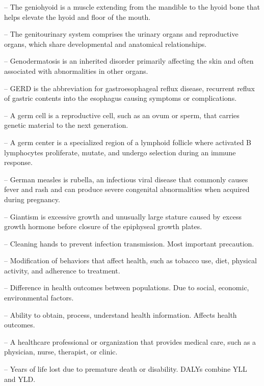 -- The geniohyoid is a muscle extending from the mandible to the hyoid bone that helps elevate the hyoid and floor of the mouth.

-- The genitourinary system comprises the urinary organs and reproductive organs, which share developmental and anatomical relationships.

-- Genodermatosis is an inherited disorder primarily affecting the skin and often associated with abnormalities in other organs.

-- GERD is the abbreviation for gastroesophageal reflux disease, recurrent reflux of gastric contents into the esophagus causing symptoms or complications.

-- A germ cell is a reproductive cell, such as an ovum or sperm, that carries genetic material to the next generation.

-- A germ center is a specialized region of a lymphoid follicle where activated B lymphocytes proliferate, mutate, and undergo selection during an immune response.

-- German measles is rubella, an infectious viral disease that commonly causes fever and rash and can produce severe congenital abnormalities when acquired during pregnancy.

-- Giantism is excessive growth and unusually large stature caused by excess growth hormone before closure of the epiphyseal growth plates.

-- Cleaning hands to prevent infection transmission. Most important precaution.

-- Modification of behaviors that affect health, such as tobacco use, diet, physical activity, and adherence to treatment.

-- Difference in health outcomes between populations. Due to social, economic, environmental factors.

-- Ability to obtain, process, understand health information. Affects health outcomes.

-- A healthcare professional or organization that provides medical care, such as a physician, nurse, therapist, or clinic.

-- Years of life lost due to premature death or disability. DALYs combine YLL and YLD.


